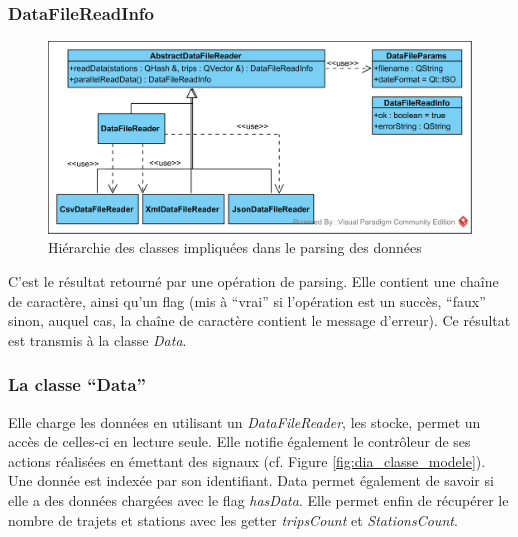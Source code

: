 \documentclass[12pt]{article}
\begin{document}
		\subsubsection{DataFileReadInfo}
		\begin{figure}[!h]
		\begin{center}
		\includegraphics[scale=1]{dia_class_parsing.png}
		\caption{Hiérarchie des classes impliquées dans le parsing des données}
		\end{center}
		\end{figure}
			
		C’est le résultat retourné par une opération de parsing. Elle contient une chaîne de caractère, ainsi qu’un flag (mis à “vrai” si l’opération est un succès, “faux” sinon, auquel cas, la chaîne de caractère contient le message d’erreur).
	Ce résultat est transmis à la classe \textit{Data}.
			
		\subsubsection{La classe “Data”}
	Elle charge les données en utilisant un \textit{DataFileReader}, les stocke, permet un accès de celles-ci en lecture seule. Elle notifie également le contrôleur de ses actions réalisées en émettant des signaux (cf. Figure \ref{fig:dia_classe_modele}). Une donnée est indexée par son identifiant. Data permet également de savoir si elle a des données chargées avec le flag \textit{hasData}. Elle permet enfin de récupérer le nombre de trajets et stations avec les getter \textit{tripsCount} et \textit{StationsCount}.
	
\end{document}
